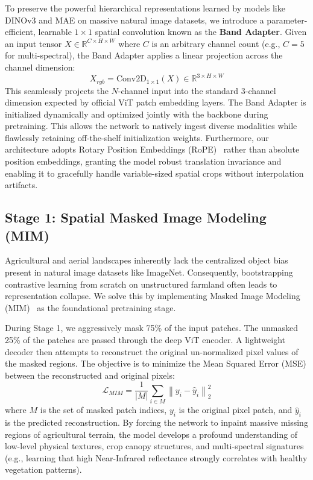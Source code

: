 To preserve the powerful hierarchical representations learned by models like DINOv3 and MAE on massive natural image datasets, we introduce a parameter-efficient, learnable $1 \times 1$ spatial convolution known as the \textbf{Band Adapter}. 
Given an input tensor $X \in \mathbb{R}^{C \times H \times W}$ where $C$ is an arbitrary channel count (e.g., $C=5$ for multi-spectral), the Band Adapter applies a linear projection across the channel dimension:
\begin{equation}
    X_{rgb} = \text{Conv2D}_{1 \times 1}(X) \in \mathbb{R}^{3 \times H \times W}
\end{equation}
This seamlessly projects the $N$-channel input into the standard 3-channel dimension expected by official ViT patch embedding layers. The Band Adapter is initialized dynamically and optimized jointly with the backbone during pretraining. This allows the network to natively ingest diverse modalities while flawlessly retaining off-the-shelf initialization weights. Furthermore, our architecture adopts Rotary Position Embeddings (RoPE)~\cite{su2024roformer} rather than absolute position embeddings, granting the model robust translation invariance and enabling it to gracefully handle variable-sized spatial crops without interpolation artifacts.

\subsection{Stage 1: Spatial Masked Image Modeling (MIM)}
\label{subsec:mim}

Agricultural and aerial landscapes inherently lack the centralized object bias present in natural image datasets like ImageNet. Consequently, bootstrapping contrastive learning from scratch on unstructured farmland often leads to representation collapse. We solve this by implementing Masked Image Modeling (MIM)~\cite{he2022masked} as the foundational pretraining stage.

During Stage 1, we aggressively mask 75\% of the input patches. The unmasked 25\% of the patches are passed through the deep ViT encoder. A lightweight decoder then attempts to reconstruct the original un-normalized pixel values of the masked regions. The objective is to minimize the Mean Squared Error (MSE) between the reconstructed and original pixels:
\begin{equation}
    \mathcal{L}_{MIM} = \frac{1}{|M|} \sum_{i \in M} \left\| y_i - \hat{y}_i \right\|_2^2
\end{equation}
where $M$ is the set of masked patch indices, $y_i$ is the original pixel patch, and $\hat{y}_i$ is the predicted reconstruction. By forcing the network to inpaint massive missing regions of agricultural terrain, the model develops a profound understanding of low-level physical textures, crop canopy structures, and multi-spectral signatures (e.g., learning that high Near-Infrared reflectance strongly correlates with healthy vegetation patterns). 

